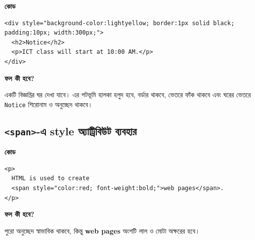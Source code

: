 \par\noindent
\begin{minipage}[t]{.54\linewidth}\vspace{0pt}\small
\textbf{\color{chFourTeal}কোড}\par
\begin{verbatim}
<div style="background-color:lightyellow; border:1px solid black; padding:10px; width:300px;">
  <h2>Notice</h2>
  <p>ICT class will start at 10:00 AM.</p>
</div>
\end{verbatim}

\par\smallskip
\end{minipage}\hfill
\begin{minipage}[t]{.42\linewidth}\vspace{0pt}\small
\textbf{\color{chFourTeal}ফল কী হবে?}\par
একটি বিজ্ঞপ্তির ঘর দেখা যাবে। এর পটভূমি হালকা হলুদ হবে, বর্ডার থাকবে, ভেতরে ফাঁক থাকবে এবং ঘরের ভেতরে \texttt{Notice} শিরোনাম ও অনুচ্ছেদ থাকবে।
\par\smallskip
\end{minipage}\par


\subsection{\texttt{<span>}-এ style অ্যাট্রিবিউট ব্যবহার}

\par\noindent
\begin{minipage}[t]{.54\linewidth}\vspace{0pt}\small
\textbf{\color{chFourTeal}কোড}\par
\begin{verbatim}
<p>
  HTML is used to create
  <span style="color:red; font-weight:bold;">web pages</span>.
</p>
\end{verbatim}

\par\smallskip
\end{minipage}\hfill
\begin{minipage}[t]{.42\linewidth}\vspace{0pt}\small
\textbf{\color{chFourTeal}ফল কী হবে?}\par
পুরো অনুচ্ছেদ স্বাভাবিক থাকবে, কিন্তু \textbf{web pages} অংশটি লাল ও মোটা অক্ষরের হবে।
\par\smallskip
\end{minipage}\par


